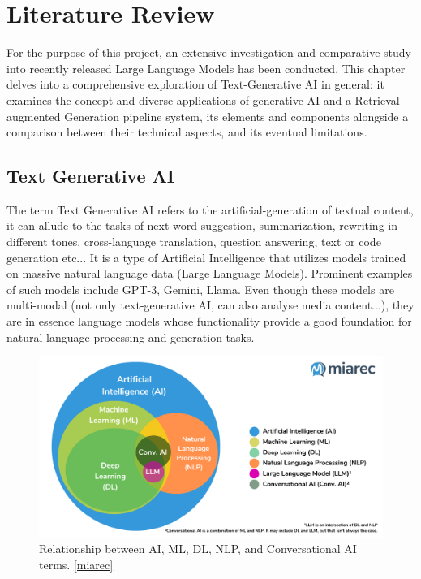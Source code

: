 \chapter{Literature Review}
For the purpose of this project, an extensive investigation and comparative study into recently released Large Language Models has been conducted. This chapter delves into a comprehensive exploration of Text-Generative AI in general: it examines the concept and diverse applications of generative AI and a Retrieval-augmented Generation pipeline system, its elements and components alongside a comparison between their technical aspects, and its eventual limitations.
\newpage

\section{Text Generative AI}
The term Text Generative AI refers to the artificial-generation of textual content, it can allude to the tasks of next word suggestion, summarization, rewriting in different tones, cross-language translation, question answering, text or code generation etc...
It is a type of Artificial Intelligence that utilizes models trained on massive natural language data (Large Language Models). Prominent examples of such models include GPT-3, Gemini, Llama. Even though these models are multi-modal (not only text-generative AI, can also analyse media content...), they are in essence language models whose functionality provide a good foundation for natural language processing and generation tasks.
\begin{figure}[htbp]
    \centering
    \includegraphics[width=\linewidth]{./figures/genai-relation-diagram.png}
    \caption{Relationship between AI, ML, DL, NLP, and Conversational AI terms. \href{https://blog.miarec.com/contact-centers-ai-definition}{[miarec]}}
\end{figure}\newline
